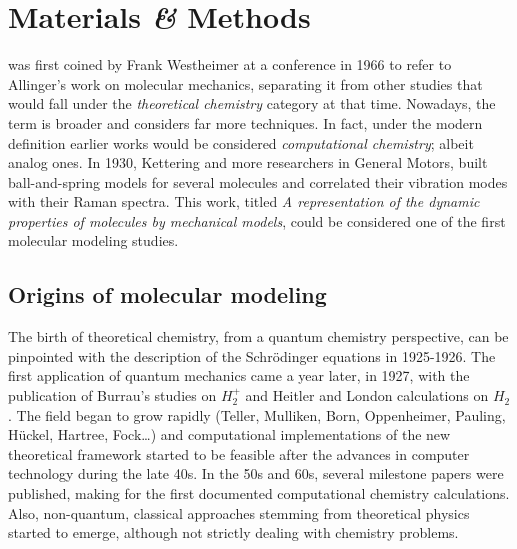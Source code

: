 \chapter{Materials \textit{\&} Methods}
\label{chap:02}

 was first coined by Frank Westheimer at a conference in 1966 to refer to Allinger’s work on molecular mechanics,\cite{Lipkowitz_2000} separating it from other studies that would fall under the \textit{theoretical chemistry} category at that time. Nowadays, the term is broader and considers far more techniques. In fact, under the modern definition earlier works would be considered \textit{computational chemistry}; albeit analog ones. In 1930, Kettering and more researchers in General Motors, built ball-and-spring models for several molecules and correlated their vibration modes with their Raman spectra. This work, titled \textit{A representation of the dynamic properties of molecules by mechanical models},\cite{kettering1930} could be considered one of the first molecular modeling studies.

\section{Origins of molecular modeling}
The birth of theoretical chemistry, from a quantum chemistry perspective, can be pinpointed with the description of the Schrödinger equations in 1925-1926.\cite{schrodinger} The first application of quantum mechanics came a year later, in 1927, with the publication of Burrau’s studies\cite{burrau1927} on $H_{2}^{+}$ and Heitler and London calculations\cite{heitlerlondon} on $H_{2}$. The field began to grow rapidly (Teller,\cite{teller1930hydrogen} Mulliken,\cite{mulliken} Born,\cite{born} Oppenheimer,\cite{Oppenheimer} Pauling,\cite{pauling} Hückel,\cite{huckel} Hartree,\cite{hartree} Fock\cite{fock}\ldots) and computational implementations of the new theoretical framework started to be feasible after the advances in computer technology during the late 40s.\cite{chistory1940} In the 50s and 60s, several milestone papers were published, making for the first documented computational chemistry calculations.\cite{bolcer2007,ccl} Also, non-quantum, classical approaches stemming from theoretical physics started to emerge, although not strictly dealing with chemistry problems.\cite{Alder1959,Gibson1960,Rahman1964}

